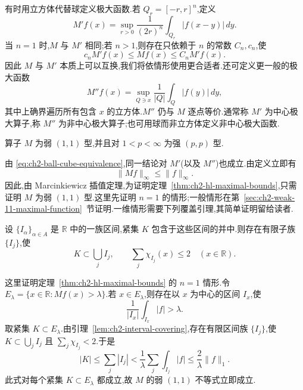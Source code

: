 有时用立方体代替球定义极大函数.若 $Q_r=[-r,r]^n$,定义
\begin{equation}
\label{eq:ch2-hl-maximal-centered-cube}
 M'f(x)=\sup_{r>0}\frac1{(2r)^n}\int_{Q_r}|f(x-y)|\,dy.
\end{equation}
当 $n=1$ 时,$M$ 与 $M'$ 相同;若 $n>1$,则存在只依赖于 $n$ 的常数 $C_n,c_n$,使
\begin{equation}
\label{eq:ch2-ball-cube-equivalence}
 c_nM'f(x)\le Mf(x)\le C_nM'f(x).
\end{equation}
因此 $M$ 与 $M'$ 本质上可以互换,我们将依情形使用更合适者.还可定义更一般的极大函数
\begin{equation}
\label{eq:ch2-hl-maximal-uncentered-cube}
 M''f(x)=\sup_{Q\ni x}\frac1{|Q|}\int_Q|f(y)|\,dy,
\end{equation}
其中上确界遍历所有包含 $x$ 的立方体.$M''$ 仍与 $M$ 逐点等价.通常称 $M'$ 为中心极大算子,称 $M''$ 为非中心极大算子;也可用球而非立方体定义非中心极大函数.

\hypertarget{sample-page-043}{}
\begin{Theorem}
\label{thm:ch2-hl-maximal-bounds}
算子 $M$ 为弱 $(1,1)$ 型,并且对 $1<p<\infty$ 为强 $(p,p)$ 型.
\end{Theorem}

由 \eqref{eq:ch2-ball-cube-equivalence},同一结论对 $M'$(以及 $M''$)也成立.由定义立即有
\begin{equation}
\label{eq:ch2-hl-maximal-linfty}
 \|Mf\|_\infty\le\|f\|_\infty.
\end{equation}
因此,由 Marcinkiewicz 插值定理,为证明定理~\ref{thm:ch2-hl-maximal-bounds},只需证明 $M$ 为弱 $(1,1)$ 型.这里先证明 $n=1$ 的情形;一般情形在第~\ref{sec:ch2-weak-11-maximal-function}~节证明.一维情形需要下列覆盖引理,其简单证明留给读者.

\begin{Lemma}
\label{lem:ch2-interval-covering}
设 $\{I_\alpha\}_{\alpha\in A}$ 是 $\mathbb R$ 中的一族区间,紧集 $K$ 包含于这些区间的并中.则存在有限子族 $\{I_j\}$,使
\[
 K\subset\bigcup_jI_j,\qquad \sum_j\chi_{I_j}(x)\le2\quad(x\in\mathbb R).
\]
\end{Lemma}

\begin{Proof}
这里证明定理~\ref{thm:ch2-hl-maximal-bounds} 的 $n=1$ 情形.令 $E_\lambda=\{x\in\mathbb R:Mf(x)>\lambda\}$.若 $x\in E_\lambda$,则存在以 $x$ 为中心的区间 $I_x$,使
\begin{equation}
\label{eq:ch2-one-dimensional-average}
 \frac1{|I_x|}\int_{I_x}|f|>\lambda.
\end{equation}
取紧集 $K\subset E_\lambda$.由引理~\ref{lem:ch2-interval-covering},存在有限区间族 $\{I_j\}$,使 $K\subset\bigcup_jI_j$ 且 $\sum_j\chi_{I_j}<2$.于是
\[
 |K|\le\sum_j|I_j|<\frac1\lambda\sum_j\int_{I_j}|f|
 \le\frac2\lambda\|f\|_1.
\]
此式对每个紧集 $K\subset E_\lambda$ 都成立,故 $M$ 的弱 $(1,1)$ 不等式立即成立.
\end{Proof}

